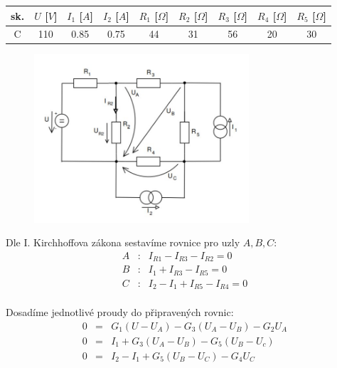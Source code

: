 \documentclass[a4paper,oneside,12pt]{article}
\begin{document}
	\begin{table}[h]
		\begin{center}
			\begin{tabular}{|c|c|c|c|c|c|c|c|c|}
				\hline
				sk. & $U$ [$V$] & $I_{1}$ [$A$] & $I_{2}$ [$A$] & $R_{1}$ [$\Omega$] & $R_{2}$ [$\Omega$] & $R_{3}$ [$\Omega$] & $R_{4}$ [$\Omega$] & $R_{5}$ [$\Omega$]\\
				\hline
				C & 110 & 0.85 & 0.75 & 44 & 31 & 56 & 20 & 30 \\
				\hline
			\end{tabular}
		\end{center}
	\end{table}

	\begin{figure}[h]
		\begin{center}
			\includegraphics[width=8cm,keepaspectratio]{images/3_img.jpg}
		\end{center}
	\end{figure}

	Dle I. Kirchhoffova zákona sestavíme rovnice pro uzly $A, B, C$:
	\begin{eqnarray*}
		A &: & I_{R1} - I_{R3} - I_{R2} = 0 \\
		B &: & I_{1} + I_{R3} - I_{R5} = 0\\
		C &: & I_{2} - I_{1} + I_{R5} - I_{R4} = 0\\
	\end{eqnarray*}


	Dosadíme jednotlivé proudy do připravených rovnic:
	\begin{eqnarray*}
		0 &= & G_{1}(U - U_{A}) - G_{3}(U_{A} - U_{B}) - G_{2}U_{A}  \\
		0 &= & I_{1} + G_{3}(U_{A} - U_{B}) - G_{5}(U_{B} - U_{c}) \\
		0 &= & I_{2} - I_{1} + G_{5}(U_{B} - U_{C}) - G_{4}U_{C} \\
	\end{eqnarray*}
\end{document}
